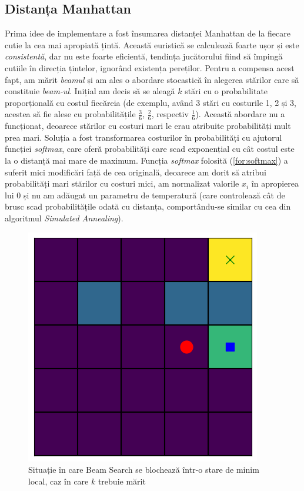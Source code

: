 \documentclass{article}
\begin{document}
\subsection{Distanța Manhattan}
Prima idee de implementare a fost însumarea distanței Manhattan de la fiecare
cutie la cea mai apropiată țintă. Această euristică se calculează foarte ușor și
este \textit{consistentă}, dar nu este foarte eficientă, tendința jucătorului 
fiind să împingă cutiile în direcția țintelor, ignorând existența pereților. 
Pentru a compensa acest fapt, am mărit \textit{beamul} și am ales o abordare
stocastică în alegerea stărilor care să constituie \textit{beam-ul}. Inițial am
decis să se aleagă $k$ stări cu o probabilitate proporțională cu costul 
fiecăreia (de exemplu, având 3 stări cu costurile 1, 2 și 3, acestea să fie 
alese cu probabilitățile $\frac{3}{6}$, $\frac{2}{6}$, respectiv $\frac{1}{6}$).
Această abordare nu a funcționat, deoarece stărilor cu costuri mari le erau 
atribuite probabilități mult prea mari. Soluția a fost transformarea costurilor
în probabilități cu ajutorul funcției \textit{softmax}, care oferă probabilități
care scad exponențial cu cât costul este la o distanță mai mare de maximum.
Funcția \textit{softmax} folosită (\ref{for:softmax}) a suferit mici modificări
față de cea originală, deoarece am dorit să atribui probabilități mari stărilor 
cu costuri mici, am normalizat valorile $x_i$ în apropierea lui 0 și nu am
adăugat un parametru de temperatură (care controlează cât de brusc scad 
probabilitățile odată cu distanța, comportându-se similar cu cea din algoritmul 
\textit{Simulated Annealing}).

\begin{figure}[ht]
    \begin{center}
        \includegraphics[scale=0.7]{manhattan.png}
    \end{center}
    \caption{Situație în care Beam Search se blochează într-o stare  de minim 
    local, caz în care $k$ trebuie mărit}
\end{figure}
\end{document}
